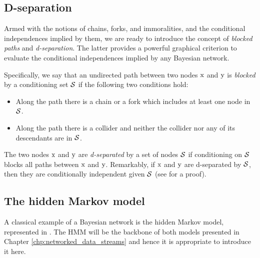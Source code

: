 \subsection{D-separation}
\label{sec:d_separation}
Armed with the notions of chains, forks, and immoralities, and the conditional independences implied by them, we are ready to introduce the concept of \emph{blocked paths} and \emph{d-separation}. The latter provides a powerful graphical criterion to evaluate the conditional independences implied by any Bayesian network.

Specifically, we say that an undirected path between two nodes ${\textnormal{x}}$ and ${\textnormal{y}}$ is \emph{blocked} by a conditioning set ${\mathcal{S}}$ if the following two conditions hold:
\begin{itemize}
    \item Along the path there is a chain or a fork which includes at least one node in ${\mathcal{S}}$.
    \item Along the path there is a collider and neither the collider nor any of its descendants are in ${\mathcal{S}}$.
\end{itemize}
The two nodes ${\textnormal{x}}$ and ${\textnormal{y}}$ are \emph{d-separated} by a set of nodes ${\mathcal{S}}$ if conditioning on ${\mathcal{S}}$ blocks all paths between ${\textnormal{x}}$ and ${\textnormal{y}}$. Remarkably, if ${\textnormal{x}}$ and ${\textnormal{y}}$ are d-separated by ${\mathcal{S}}$, then they are conditionally independent given ${\mathcal{S}}$ (see \citet{Koller2009} for a proof).

\subsection{The hidden Markov model}
\label{sec:hmm}
A classical example of a Bayesian network is the hidden Markov model, represented in . The HMM will be the backbone of both models presented in Chapter \ref{chp:networked_data_streams} and hence it is appropriate to introduce it here.

